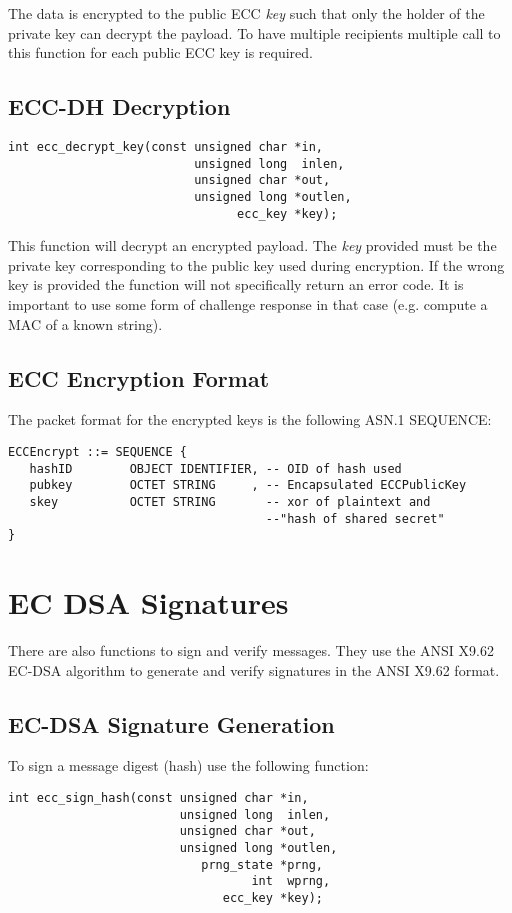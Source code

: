 \documentclass[synpaper]{book}
\newcommand{\mysection}[1]    %
	{                   %
	\section{#1}
   \markboth{\textsf{www.libtom.net}}{\thesection ~ {#1}}
	}
\begin{document}
The data is encrypted to the public ECC \textit{key} such that only the holder of the private key can decrypt the payload.  To have multiple
recipients multiple call to this function for each public ECC key is required.

\subsection{ECC-DH Decryption}
\begin{verbatim}
int ecc_decrypt_key(const unsigned char *in,
                          unsigned long  inlen,
                          unsigned char *out,
                          unsigned long *outlen,
                                ecc_key *key);
\end{verbatim}

This function will decrypt an encrypted payload.  The \textit{key} provided must be the private key corresponding to the public key
used during encryption.  If the wrong key is provided the function will not specifically return an error code.  It is important
to use some form of challenge response in that case (e.g. compute a MAC of a known string).

\subsection{ECC Encryption Format}
The packet format for the encrypted keys is the following ASN.1 SEQUENCE:

\begin{verbatim}
ECCEncrypt ::= SEQUENCE {
   hashID        OBJECT IDENTIFIER, -- OID of hash used
   pubkey        OCTET STRING     , -- Encapsulated ECCPublicKey
   skey          OCTET STRING       -- xor of plaintext and
                                    --"hash of shared secret"
}
\end{verbatim}

\mysection{EC DSA Signatures}

There are also functions to sign and verify messages.  They use the ANSI X9.62 EC-DSA algorithm to generate and verify signatures in the
ANSI X9.62 format.

\subsection{EC-DSA Signature Generation}
To sign a message digest (hash) use the following function:

\begin{verbatim}
int ecc_sign_hash(const unsigned char *in,
                        unsigned long  inlen,
                        unsigned char *out,
                        unsigned long *outlen,
                           prng_state *prng,
                                  int  wprng,
                              ecc_key *key);
\end{verbatim}
\end{document}

